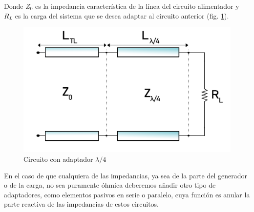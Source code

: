\par Donde $Z_{0}$ es la impedancia característica de la línea del circuito alimentador y $R_{L}$ es la carga del sistema que se desea adaptar al circuito anterior (fig. \ref{fig:lambdacuartos}).

\begin{figure}[h]
    \centering
        \includegraphics[width=12cm]{archivos/parche/lambda}
        \caption{Circuito con adaptador $\lambda/4$}
        \label{fig:lambdacuartos}
\end{figure}

\par En el caso de que cualquiera de las impedancias, ya sea de la parte del generador o de la carga, no sea puramente óhmica deberemos añadir otro tipo de adaptadores, como elementos pasivos en serie o paralelo, cuya función es anular la parte reactiva de las impedancias de estos circuitos.












